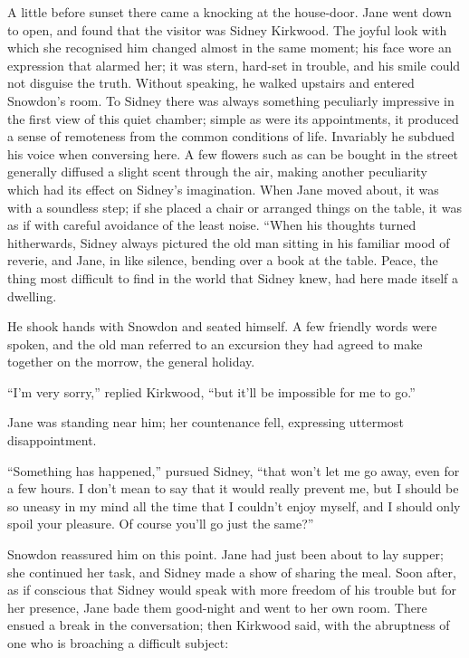 A little before sunset there came a knocking at the house-door. Jane
went down to open, and found that the visitor was Sidney Kirkwood. The
joyful look with which she recognised him changed almost in the same
moment; his face wore an expression that alarmed her; it was stern,
hard-set in trouble, and his smile could not disguise the truth. Without
speaking, he walked upstairs and entered Snowdon's room. To Sidney there
was always something peculiarly impressive in the first view of this
quiet chamber; simple as were its appointments, it produced a sense
{\protect\hypertarget{244}{}{}}of remoteness from the common conditions
of life. Invariably he subdued his voice when conversing here. A few
flowers such as can be bought in the street generally diffused a slight
scent through the air, making another peculiarity which had its effect
on Sidney's imagination. When Jane moved about, it was with a soundless
step; if she placed a chair or arranged things on the table, it was as
if with careful avoidance of the least noise. ``When his thoughts turned
hitherwards, Sidney always pictured the old man sitting in his familiar
mood of reverie, and Jane, in like silence, bending over a book at the
table. Peace, the thing most difficult to find in the world that Sidney
knew, had here made itself a dwelling.

He shook hands with Snowdon and seated himself. A few friendly words
were spoken, and the old man referred to an excursion they had agreed to
make together on the morrow, the general holiday.

``I'm very sorry,'' replied Kirkwood, ``but it'll be impossible for me
to go.''

{\protect\hypertarget{245}{}{}}Jane was standing near him; her
countenance fell, expressing uttermost disappointment.

``Something has happened,'' pursued Sidney, ``that won't let me go away,
even for a few hours. I don't mean to say that it would really prevent
me, but I should be so uneasy in my mind all the time that I couldn't
enjoy myself, and I should only spoil your pleasure. Of course you'll go
just the same?''

Snowdon reassured him on this point. Jane had just been about to lay
supper; she continued her task, and Sidney made a show of sharing the
meal. Soon after, as if conscious that Sidney would speak with more
freedom of his trouble but for her presence, Jane bade them good-night
and went to her own room. There ensued a break in the conversation; then
Kirkwood said, with the abruptness of one who is broaching a difficult
subject:


